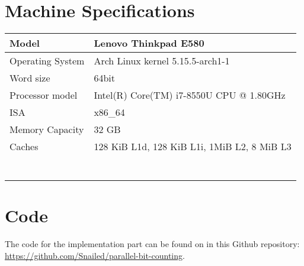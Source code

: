 \begin{appendices}
\section{Machine Specifications}
\label{appendix:machine-specs}
\begin{table}[H]
\begin{tabular}{ll}
\hline
\multicolumn{1}{|l|}{Model}            & \multicolumn{1}{l|}{Lenovo Thinkpad E580}                        \\ \hline
\multicolumn{1}{|l|}{Operating System} & \multicolumn{1}{l|}{Arch Linux kernel 5.15.5-arch1-1}            \\ \hline
\multicolumn{1}{|l|}{Word size}        & \multicolumn{1}{l|}{64bit}                                       \\ \hline
\multicolumn{1}{|l|}{Processor model}  & \multicolumn{1}{l|}{Intel(R) Core(TM) i7-8550U CPU @ 1.80GHz}    \\ \hline
\multicolumn{1}{|l|}{ISA}              & \multicolumn{1}{l|}{x86\_64}                                     \\ \hline
\multicolumn{1}{|l|}{Memory Capacity}              & \multicolumn{1}{l|}{32 GB}                                     \\ \hline
\multicolumn{1}{|l|}{Caches}           & \multicolumn{1}{l|}{128 KiB L1d, 128 KiB L1i, 1MiB L2, 8 MiB L3} \\ \hline
                                       &                                                                  \\
                                       &                                                                  \\
                                       &                                                                  \\
                                       &                                                                  \\
                                       &                                                                  \\
                                       &                                                                  \\
                                       &                                                                 
\end{tabular}
\end{table}

\section{Code}
\label{appendix:code}
The code for the implementation part can be found on in this Github repository: \url{https://github.com/Snailed/parallel-bit-counting}.
\end{appendices}
